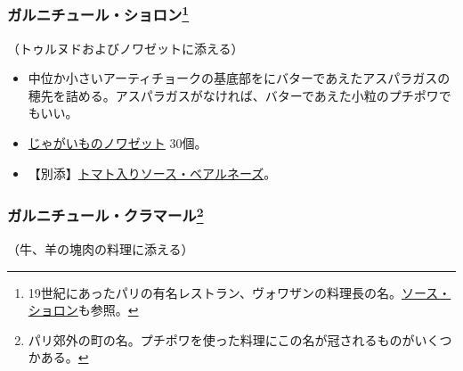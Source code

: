 \begin{recette}
\atoaki{}

\hypertarget{garniture-choron}{%
\subsubsection[ガルニチュール・ショロン]{\texorpdfstring{ガルニチュール・ショロン\footnote{19世紀にあったパリの有名レストラン、ヴォワザンの料理長の名。\protect\hyperlink{sauce-bearnaise-tomatee}{ソース・ショロン}も参照。}}{ガルニチュール・ショロン}}\label{garniture-choron}}



（トゥルヌドおよびノワゼットに添える）

\begin{itemize}
\item
  中位か小さいアーティチョークの基底部をにバターであえたアスパラガスの穂先を詰める。アスパラガスがなければ、バターであえた小粒のプチポワでもいい。
\item
  \protect\hyperlink{pommes-de-terre-noisette}{じゃがいものノワゼット}
  30個。
\item
  【別添】\protect\hyperlink{sauce-bearnaise-tomatee}{トマト入りソース・ベアルネーズ}。
\end{itemize}

\atoaki{}

\hypertarget{garniture-clamart}{%
\subsubsection[ガルニチュール・クラマール]{\texorpdfstring{ガルニチュール・クラマール\footnote{パリ郊外の町の名。プチポワを使った料理にこの名が冠されるものがいくつかある。}}{ガルニチュール・クラマール}}\label{garniture-clamart}}



（牛、羊の塊肉の料理に添える）


\end{recette}
